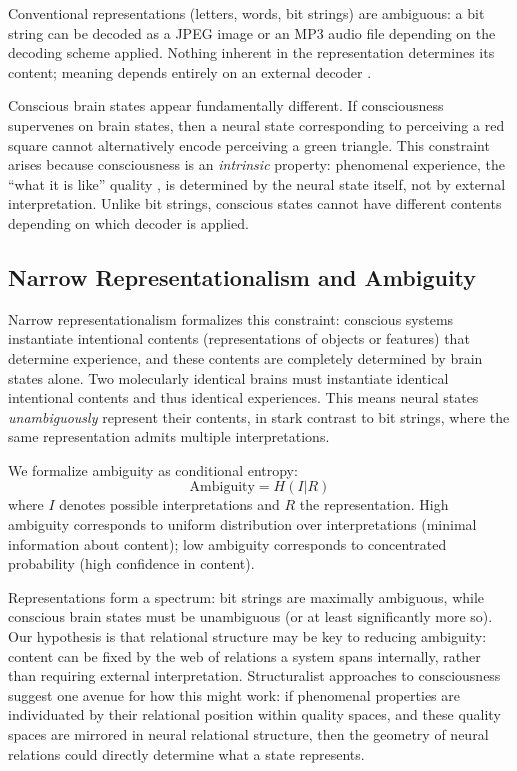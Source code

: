 Conventional representations (letters, words, bit strings) are ambiguous: a bit string can be decoded as a JPEG image or an MP3 audio file depending on the decoding scheme applied. Nothing inherent in the representation determines its content; meaning depends entirely on an external decoder \citep{searle1980minds}.

Conscious brain states appear fundamentally different. If consciousness supervenes on brain states, then a neural state corresponding to perceiving a red square cannot alternatively encode perceiving a green triangle. This constraint arises because consciousness is an \emph{intrinsic} property: phenomenal experience, the ``what it is like'' quality \citep{nagel1974bat}, is determined by the neural state itself, not by external interpretation. Unlike bit strings, conscious states cannot have different contents depending on which decoder is applied.

\subsection{Narrow Representationalism and Ambiguity}

Narrow representationalism \citep{chalmers2004representational} formalizes this constraint: conscious systems instantiate intentional contents (representations of objects or features) that determine experience, and these contents are completely determined by brain states alone. Two molecularly identical brains must instantiate identical intentional contents and thus identical experiences. This means neural states \emph{unambiguously} represent their contents, in stark contrast to bit strings, where the same representation admits multiple interpretations.

We formalize ambiguity as conditional entropy:
\begin{equation}
\text{Ambiguity} = H(I|R)
\end{equation}
where $I$ denotes possible interpretations and $R$ the representation. High ambiguity corresponds to uniform distribution over interpretations (minimal information about content); low ambiguity corresponds to concentrated probability (high confidence in content).

Representations form a spectrum: bit strings are maximally ambiguous, while conscious brain states must be unambiguous (or at least significantly more so). Our hypothesis is that relational structure may be key to reducing ambiguity: content can be fixed by the web of relations a system spans internally, rather than requiring external interpretation. Structuralist approaches to consciousness \citep{lyre2022neurophenomenal, kleiner2024mathematical} suggest one avenue for how this might work: if phenomenal properties are individuated by their relational position within quality spaces, and these quality spaces are mirrored in neural relational structure, then the geometry of neural relations could directly determine what a state represents.

